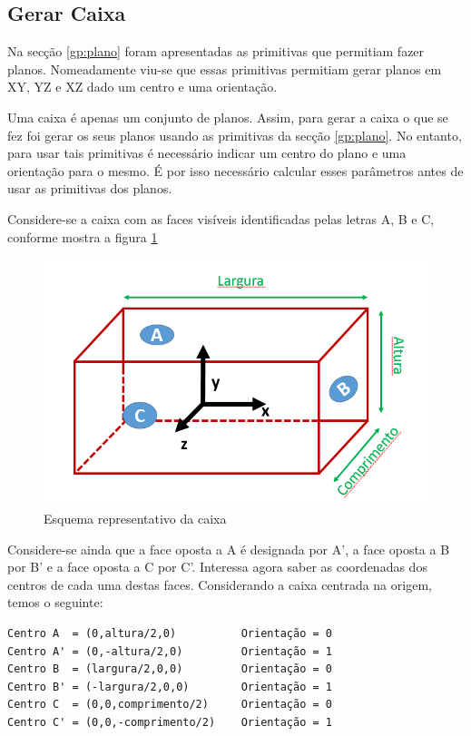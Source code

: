 \subsection{Gerar Caixa}


Na secção \ref{gp:plano} foram apresentadas as primitivas que permitiam fazer planos. Nomeadamente viu-se que essas primitivas permitiam gerar planos em XY, YZ e XZ dado um centro e uma orientação.

Uma caixa é apenas um conjunto de planos. Assim, para gerar a caixa o que se fez foi gerar os seus planos usando as primitivas da secção \ref{gp:plano}. No entanto, para usar tais primitivas é necessário indicar um centro do plano e uma orientação para o mesmo. É por isso necessário calcular esses parâmetros antes de usar as primitivas dos planos.

Considere-se a caixa com as faces visíveis identificadas pelas letras A, B e C, conforme mostra a figura \ref{p1:fig:p3_Caixa}

\begin{figure}[<+htpb+>]
	\centering
	\includegraphics[scale=0.5]{imagens/p3_Caixa.png}
	\caption{Esquema representativo da caixa}
	\label{p1:fig:p3_Caixa}
\end{figure}

Considere-se ainda que a face oposta a A é designada por A', a face oposta a B por B' e a face oposta a C por C'.
Interessa agora saber as coordenadas dos centros de cada uma destas faces. Considerando a caixa centrada na origem, temos o seguinte:

\begin{Verbatim}
Centro A  = (0,altura/2,0)          Orientação = 0
Centro A' = (0,-altura/2,0)         Orientação = 1
Centro B  = (largura/2,0,0)         Orientação = 0
Centro B' = (-largura/2,0,0)        Orientação = 1
Centro C  = (0,0,comprimento/2)     Orientação = 0
Centro C' = (0,0,-comprimento/2)    Orientação = 1
\end{Verbatim}

